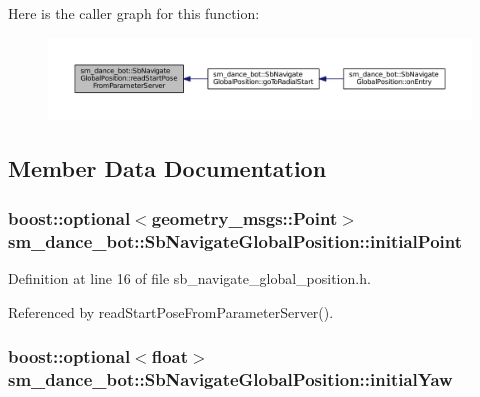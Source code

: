 Here is the caller graph for this function\+:
\nopagebreak
\begin{figure}[H]
\begin{center}
\leavevmode
\includegraphics[width=350pt]{classsm__dance__bot_1_1SbNavigateGlobalPosition_adc268e278b7de844202959036f424a91_icgraph}
\end{center}
\end{figure}




\subsection{Member Data Documentation}
\subsubsection[{\texorpdfstring{initial\+Point}{initialPoint}}]{\setlength{\rightskip}{0pt plus 5cm}boost\+::optional$<$geometry\+\_\+msgs\+::\+Point$>$ sm\+\_\+dance\+\_\+bot\+::\+Sb\+Navigate\+Global\+Position\+::initial\+Point}\hypertarget{classsm__dance__bot_1_1SbNavigateGlobalPosition_ae4312e56f4859f5a4cd251fd136b3713}{}\label{classsm__dance__bot_1_1SbNavigateGlobalPosition_ae4312e56f4859f5a4cd251fd136b3713}


Definition at line 16 of file sb\+\_\+navigate\+\_\+global\+\_\+position.\+h.



Referenced by read\+Start\+Pose\+From\+Parameter\+Server().

\subsubsection[{\texorpdfstring{initial\+Yaw}{initialYaw}}]{\setlength{\rightskip}{0pt plus 5cm}boost\+::optional$<$float$>$ sm\+\_\+dance\+\_\+bot\+::\+Sb\+Navigate\+Global\+Position\+::initial\+Yaw}\hypertarget{classsm__dance__bot_1_1SbNavigateGlobalPosition_af9096cd0b198b1f9ed2c826ca03949d4}{}\label{classsm__dance__bot_1_1SbNavigateGlobalPosition_af9096cd0b198b1f9ed2c826ca03949d4}


